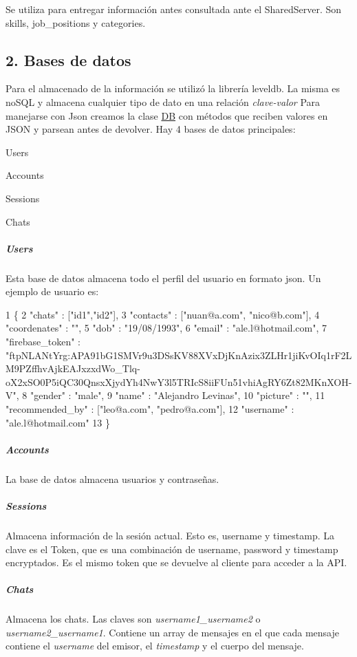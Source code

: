 Se utiliza para entregar información antes consultada ante el Shared\+Server. Son skills, job\+\_\+positions y categories.



 \subsection*{2. Bases de datos}

Para el almacenado de la información se utilizó la librería leveldb. La misma es no\+S\+QL y almacena cualquier tipo de dato en una relación {\itshape clave-\/valor} Para manejarse con Json creamos la clase \hyperlink{classDB}{DB} con métodos que reciben valores en J\+S\+ON y parsean antes de devolver. Hay 4 bases de datos principales\+:


\begin{DoxyItemize}
\item Users
\item Accounts
\item Sessions
\item Chats
\end{DoxyItemize}

\subparagraph*{Users}

Esta base de datos almacena todo el perfil del usuario en formato json. Un ejemplo de usuario es\+: 
\begin{DoxyCode}
1 \{
2         "chats" : ["id1","id2"],
3         "contacts" : ["nuan@a.com", "nico@b.com"],
4         "coordenates" : "",
5         "dob" : "19/08/1993",
6         "email" : "ale.l@hotmail.com",
7         "firebase\_token" :
       "ftpNLANtYrg:APA91bG1SMVr9u3DSsKV88XVxDjKnAzix3ZLHr1jiKvOIq1rF2LM9PZffhvAjkEAJxzxdWo\_Tlq-oX2xSO0P5iQC30QnsxXjydYh4NwY3l5TRIcS8iiFUn51vhiAgRY6Zt82MKnXOH-V",
8         "gender" : "male",
9         "name" : "Alejandro Levinas",
10         "picture" : "",
11         "recommended\_by" : ["leo@a.com", "pedro@a.com"],
12         "username" : "ale.l@hotmail.com"
13 \}
\end{DoxyCode}
 \subparagraph*{Accounts}

La base de datos almacena usuarios y contraseñas. \subparagraph*{Sessions}

Almacena información de la sesión actual. Esto es, username y timestamp. La clave es el Token, que es una combinación de username, password y timestamp encryptados. Es el mismo token que se devuelve al cliente para acceder a la A\+PI. \subparagraph*{Chats}

Almacena los chats. Las claves son {\itshape username1\+\_\+username2} o {\itshape username2\+\_\+username1}. Contiene un array de mensajes en el que cada mensaje contiene el {\itshape username} del emisor, el {\itshape timestamp} y el cuerpo del mensaje. 

